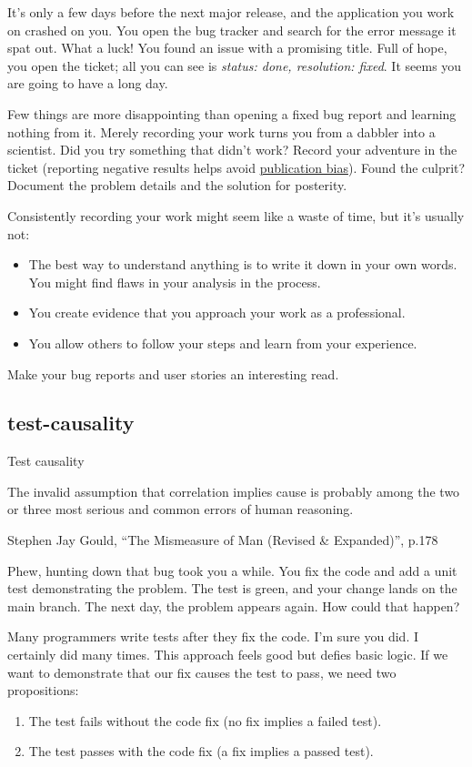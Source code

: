 \documentclass{article}
\begin{document}
It's only a few days before the next major release, and the application you work on crashed on you.
You open the bug tracker and search for the error message it spat out.
What a luck!
You found an issue with a promising title.
Full of hope, you open the ticket; all you can see is \emph{status: done, resolution: fixed}.
It seems you are going to have a long day.

Few things are more disappointing than opening a fixed bug report and learning nothing from it.
Merely recording your work turns you from a dabbler into a scientist.
Did you try something that didn't work?
Record your adventure in the ticket (reporting negative results helps avoid \href{https://en.wikipedia.org/wiki/Publication_bias}{publication bias}).
Found the culprit?
Document the problem details and the solution for posterity.

Consistently recording your work might seem like a waste of time, but it's usually not:
\begin{itemize}
\item The best way to understand anything is to write it down in your own words.
You might find flaws in your analysis in the process.
\item You create evidence that you approach your work as a professional.
\item You allow others to follow your steps and learn from your experience.
\end{itemize}

Make your bug reports and user stories an interesting read.

\subsection{test-causality}{Test causality}
\epigraph{
  The invalid assumption that correlation implies cause is probably among the two or three most serious and common errors of human reasoning.
}{Stephen Jay Gould, ``The Mismeasure of Man (Revised \& Expanded)'', p.178}

Phew, hunting down that bug took you a while.
You fix the code and add a unit test demonstrating the problem.
The test is green, and your change lands on the main branch.
The next day, the problem appears again.
How could that happen?

Many programmers write tests after they fix the code.
I'm sure you did.
I certainly did many times.
This approach feels good but defies basic logic.
If we want to demonstrate that our fix causes the test to pass, we need two propositions: 
\begin{enumerate}
\item The test fails without the code fix (no fix implies a failed test).
\item The test passes with the code fix (a fix implies a passed test).
\end{enumerate}
\end{document}
